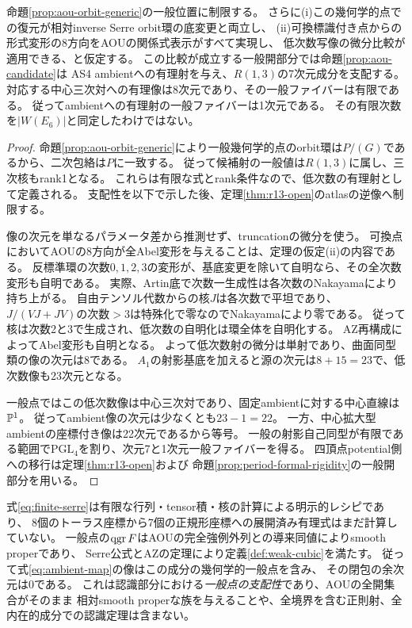 \begin{theorem}[一般AOU点からのambientの像]\label{thm:aou-dominance}
命題\ref{prop:aou-orbit-generic}の一般位置に制限する。
さらに(i)この幾何学的点での復元が相対inverse Serre orbit環の底変更と両立し、
(ii)可換標識付き点からの形式変形の8方向をAOUの関係式表示がすべて実現し、
低次数写像の微分比較が適用できる、と仮定する。
この比較が成立する一般開部分では命題\ref{prop:aou-candidate}は
AS4 ambientへの有理射を与え、$R(1,3)$の7次元成分を支配する。
対応する中心三次対への有理像は8次元であり、その一般ファイバーは有限である。
従ってambientへの有理射の一般ファイバーは1次元である。
その有限次数を$|W(E_6)|$と同定したわけではない。
\end{theorem}
\begin{proof}
命題\ref{prop:aou-orbit-generic}により一般幾何学的点のorbit環は$P/(G)$であるから、二次包絡は$P$に一致する。
従って候補射の一般値は$R(1,3)$に属し、三次核もrank1となる。
これらは有限な式とrank条件なので、低次数の有理射として定義される。
支配性を以下で示した後、定理\ref{thm:r13-open}のatlasの逆像へ制限する。

像の次元を単なるパラメータ差から推測せず、truncationの微分を使う。
可換点においてAOUの8方向が全Abel変形を与えることは、定理の仮定(ii)の内容である。
反標準環の次数$0,1,2,3$の変形が、基底変更を除いて自明なら、その全次数変形も自明である。
実際、Artin底で次数一生成性は各次数のNakayamaにより持ち上がる。
自由テンソル代数からの核$J$は各次数で平坦であり、
$J/(VJ+JV)$の次数$>3$は特殊化で零なのでNakayamaにより零である。
従って核は次数2と3で生成され、低次数の自明化は環全体を自明化する。
AZ再構成によってAbel変形も自明となる。
よって低次数射の微分は単射であり、曲面同型類の像の次元は8である。
$A_1$の射影基底を加えると源の次元は$8+15=23$で、低次数像も23次元となる。

一般点ではこの低次数像は中心三次対であり、固定ambientに対する中心直線は$\mathbb P^1$。
従ってambient像の次元は少なくとも$23-1=22$。
一方、中心拡大型ambientの座標付き像は22次元であるから等号。
一般の射影自己同型が有限である範囲で$\mathrm{PGL}_4$を割り、次元7と1次元一般ファイバーを得る。
四頂点potential側への移行は定理\ref{thm:r13-open}および
命題\ref{prop:period-formal-rigidity}の一般開部分を用いる。
\end{proof}

\begin{remark}[有理射と弱い対象の全域の射]
式\eqref{eq:finite-serre}は有限な行列・tensor積・核の計算による明示的レシピであり、
8個のトーラス座標から7個の正規形座標への展開済み有理式はまだ計算していない。
一般点の$\operatorname{qgr} F$はAOUの完全強例外列との導来同値によりsmooth properであり、
Serre公式とAZの定理により定義\ref{def:weak-cubic}を満たす。
従って式\eqref{eq:ambient-map}の像はこの成分の幾何学的一般点を含み、
その閉包の余次元は0である。
これは認識部分における\emph{一般点の支配性}であり、AOUの全開集合がそのまま
相対smooth properな族を与えることや、全境界を含む正則射、全内在的成分での認識定理は含まない。
\end{remark}
